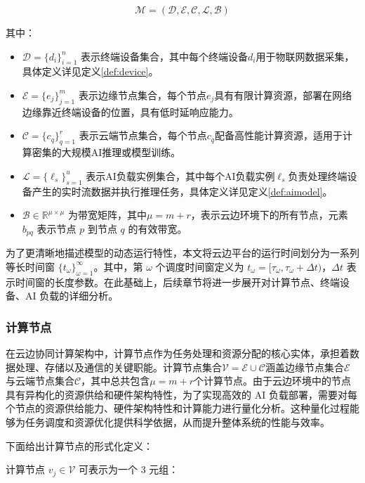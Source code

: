 $$
\mathcal{M} = (\mathcal{D}, \mathcal{E}, \mathcal{C}, \mathcal{L}, \mathcal{B})
$$

其中：

\begin{itemize}
    \item $\mathcal{D} = \{d_i\}_{i=1}^n$ 表示终端设备集合，其中每个终端设备$d_i$用于物联网数据采集，具体定义详见定义\ref{def:device}。
    \item $\mathcal{E} = \{e_j\}_{j=1}^m$ 表示边缘节点集合，每个节点$e_j$具有有限计算资源，部署在网络边缘靠近终端设备的位置，具有低时延响应能力。
    \item $\mathcal{C} = \{c_q\}_{q=1}^r$ 表示云端节点集合，每个节点$c_q$配备高性能计算资源，适用于计算密集的大规模AI推理或模型训练。
    \item $\mathcal{L} = \{\ell_s\}_{s=1}^u$ 表示AI负载实例集合，其中每个AI负载实例$\ell_s$负责处理终端设备产生的实时流数据并执行推理任务，具体定义详见定义\ref{def:aimodel}。
    \item $\mathcal{B} \in \mathbb{R}^{\mu \times \mu}$ 为带宽矩阵，其中$\mu=m+r$，表示云边环境下的所有节点，元素 $b_{pq}$ 表示节点 $p$ 到节点 $q$ 的有效带宽。
\end{itemize}

为了更清晰地描述模型的动态运行特性，本文将云边平台的运行时间划分为一系列等长时间窗 $\{t_\omega\}_{\omega=1}^\infty$。其中，第 $\omega$ 个调度时间窗定义为 $t_\omega = [\tau_\omega, \tau_\omega + \Delta t)$，$\Delta t$ 表示时间窗的长度参数。在此基础上，后续章节将进一步展开对计算节点、终端设备、AI 负载的详细分析。

\subsubsection{计算节点}

在云边协同计算架构中，计算节点作为任务处理和资源分配的核心实体，承担着数据处理、存储以及通信的关键职能。计算节点集合$\mathcal{V} = \mathcal{E} \cup \mathcal{C}$涵盖边缘节点集合$\mathcal{E}$与云端节点集合$\mathcal{C}$，其中总共包含$\mu=m+r$个计算节点。由于云边环境中的节点具有异构化的资源供给和硬件架构特性，为了实现高效的 AI 负载部署，需要对每个节点的资源供给能力、硬件架构特性和计算能力进行量化分析。这种量化过程能够为任务调度和资源优化提供科学依据，从而提升整体系统的性能与效率。

下面给出计算节点的形式化定义：

\begin{definition}[计算节点]
\label{def:node}
计算节点 $v_j \in \mathcal{V}$ 可表示为一个 3 元组：
\end{definition}

